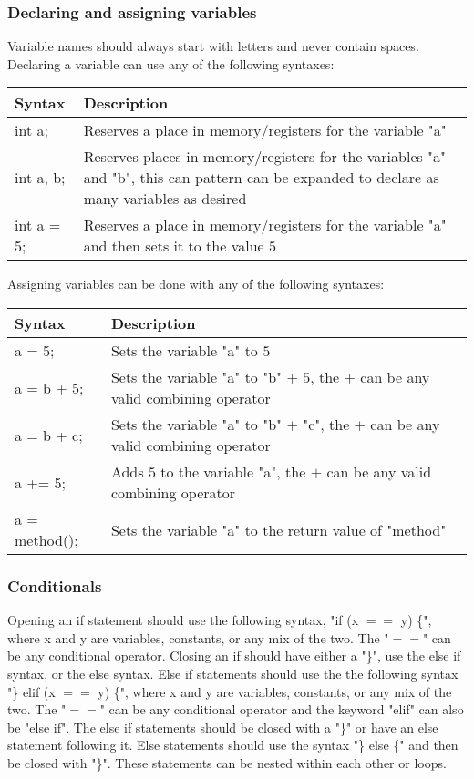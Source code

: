 		\subsubsection{Declaring and assigning variables}
			Variable names should always start with letters and never contain spaces.  Declaring a variable can use any of the following syntaxes:\\
			\begin{center} \begin{tabular}{| l | p{10cm} |} \hline
				Syntax     & Description \\ \hline
				int a;     & Reserves a place in memory/registers for the variable "a"\\ \hline
				int a, b;  & Reserves places in memory/registers for the variables "a" and "b", this can pattern can be expanded to declare as many variables as desired\\ \hline
				int a = 5; & Reserves a place in memory/registers for the variable "a" and then sets it to the value $5$\\ \hline
			\end{tabular} \end{center}
			Assigning variables can be done with any of the following syntaxes:\\
			\begin{center} \begin{tabular}{| l | p{10cm} |} \hline
				Syntax        & Description \\ \hline
				a = 5;        & Sets the variable "a" to $5$\\ \hline
				a = b + 5;    & Sets the variable "a" to "b" $+$ $5$, the $+$ can be any valid combining operator\\ \hline
				a = b + c;    & Sets the variable "a" to "b" $+$ "c", the $+$ can be any valid combining operator\\ \hline
				a += 5;       & Adds $5$ to the variable "a", the $+$ can be any valid combining operator\\ \hline
				a = method(); & Sets the variable "a" to the return value of "method"\\ \hline
			\end{tabular} \end{center}
		\subsubsection{Conditionals}
			Opening an if statement should use the following syntax, "if (x $==$ y) \{", where x and y are variables, constants, or any mix of the two. The "$==$" can be any conditional operator. Closing an if should have either a "\}", use the else if syntax, or the else syntax.  Else if statements should use the the following syntax "\} elif (x $==$ y) \{", where x and y are variables, constants, or any mix of the two.  The "$==$" can be any conditional operator and the keyword "elif" can also be "else if".  The else if statements should be closed with a "\}" or have an else statement following it.  Else statements should use the syntax "\} else \{" and then be closed with "\}".  These statements can be nested within each other or loops.
